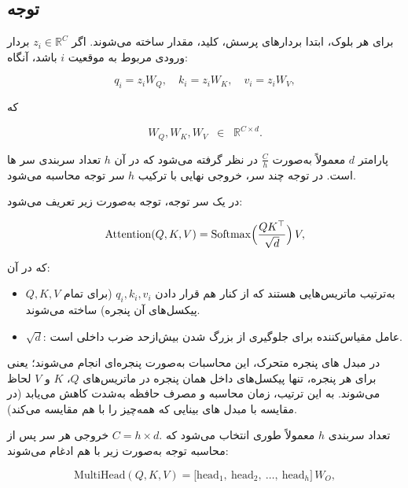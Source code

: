 	
\subsection{توجه}

برای هر بلوک، ابتدا بردارهای پرسش، کلید، مقدار ساخته می‌شوند. 
اگر \(\displaystyle z_i \in \mathbb{R}^C\) بردار ورودی مربوط به موقعیت \(i\) باشد، آنگاه:


\begin{equation}
	q_i = z_i W_Q, 
	\quad
	k_i = z_i W_K,
	\quad
	v_i = z_i W_V,
\end{equation}

	که 

\[
W_Q, W_K, W_V \;\;\in \;\;\mathbb{R}^{C \times d}.
\]

پارامتر \(\displaystyle d\) معمولاً به‌صورت \(\displaystyle \tfrac{C}{h}\) در نظر گرفته می‌شود 
که در آن \(\displaystyle h\) تعداد سربندی  سر ها است. 
در توجه چند سر، خروجی نهایی با ترکیب \(\displaystyle h\) سر توجه محاسبه می‌شود.

در یک سر توجه، توجه به‌صورت زیر تعریف می‌شود:

\begin{equation}
	\mathrm{Attention}(Q, K, V)
	=
	\mathrm{Softmax}\Bigl(\frac{QK^\top}{\sqrt{d}}\Bigr)\,V,
\end{equation}

که در آن:

\begin{itemize}
	\item \(\displaystyle Q, K, V\) به‌ترتیب ماتریس‌هایی هستند که از کنار هم قرار دادن 
	\(\displaystyle q_i, k_i, v_i\) (برای تمام پیکسل‌های آن پنجره) ساخته می‌شوند.
	\item \(\displaystyle \sqrt{d}\): عامل مقیاس‌کننده برای جلوگیری از بزرگ شدن بیش‌ازحد ضرب داخلی است.
\end{itemize}

در مبدل های پنجره متحرک، این محاسبات به‌صورت پنجره‌ای انجام می‌شوند؛ یعنی 
برای هر پنجره، تنها پیکسل‌های داخل همان پنجره در ماتریس‌های 
\(\displaystyle Q\)، \(\displaystyle K\) و \(\displaystyle V\) لحاظ می‌شوند. 
به این ترتیب، زمان محاسبه و مصرف حافظه به‌شدت کاهش می‌یابد 
(در مقایسه با مبدل های بینایی که همه‌چیز را با هم مقایسه می‌کند).

تعداد سربندی \(\displaystyle h\) معمولاً طوری انتخاب می‌شود که 
\(\displaystyle C = h \times d.\) 
خروجی هر سر پس از محاسبه توجه به‌صورت زیر با هم ادغام می‌شوند:

\begin{equation}
	\mathrm{MultiHead}(Q,K,V) 
	= 
	\bigl[\text{head}_1,\ \text{head}_2,\ \dots,\ \text{head}_h\bigr]\,
	W_O,
\end{equation}

